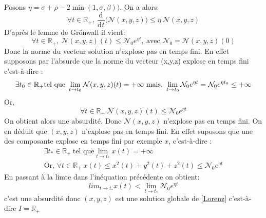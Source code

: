 \documentclass{article}
\newcommand{\R}{\mathbb{R}}
\newcommand{\deriv}[3][ ]{
    \ensuremath{\frac{\mathrm{d}^{#1}#2}{\mathrm{d}^{#1} #3}}
}
\newcommand{\cad}{c'est-\`a-dire }
\begin{document}
Posons $ \eta = \sigma + \rho - 2 \min (1,\sigma,\beta))$. On a alors: 
\[
    \forall t \in \R_+, \: \deriv{}{t}\bigg( \mathcal{N}(x,y,z)\bigg) \le \eta\: \mathcal{N}(x,y,z)
\]
D'après le lemme de Grönwall il vient:
\[
    \forall t \in \R_+,\: \mathcal{N}(x,y,z)(t) \le \mathcal{N}_0 e^{\eta t},\: \textrm{avec } \mathcal{N}_0 = \mathcal{N}(x,y,z)(0)
\]
Donc la norme du vecteur solution n'explose pas en temps fini. En effet supposons par l'absurde que la norme du vecteur (x,y,z) explose en temps fini \cad: 
\[
\exists t_0 \in \R_+ \textrm{tel que } \lim_{t \to t_0} \mathcal{N}(x,y,z)(t)=+\infty \  \textrm{mais, } \\
\lim_{t\to t_0} \mathcal{N}_0 e^{\eta t} = \mathcal{N}_0 e^{\eta t_0} \le + \infty
\]
Or,
\[\forall t \in \R_+ \: \mathcal{N}(x,y,z)(t) \le \mathcal{N}_0 e^{\eta t}
\]On obtient alors une absurdité. Donc $\mathcal{N}(x,y,z)$ n'explose pas en temps fini. On en déduit que $(x,y,z)$ n'explose pas en temps fini. En effet suposons que une des composante explose en temps fini par exemple $x$, \cad:
\begin{gather*}
    \exists t_* \in \R_+ \: \textrm{tel que} \lim_{t \to t_*} x(t) = + \infty\\
    \textrm{Or, } \forall t \in \R_+ \: x(t) \le x^2(t) + y^2(t) + z^2(t) \le \mathcal{N}_0 e^{\eta t}
\end{gather*}
En passant \`a la limte dans l'inéquation précédente on obtient:
\[
    lim_{t \to t_*} x(t) < \lim_{t \to t_*} \mathcal{N}_0 e^{\eta t}
\]
c'est une absurdité donc $(x,y,z)$ est une solution globale de \eqref{Lorenz} \cad $I=\R_+$
\end{document}
